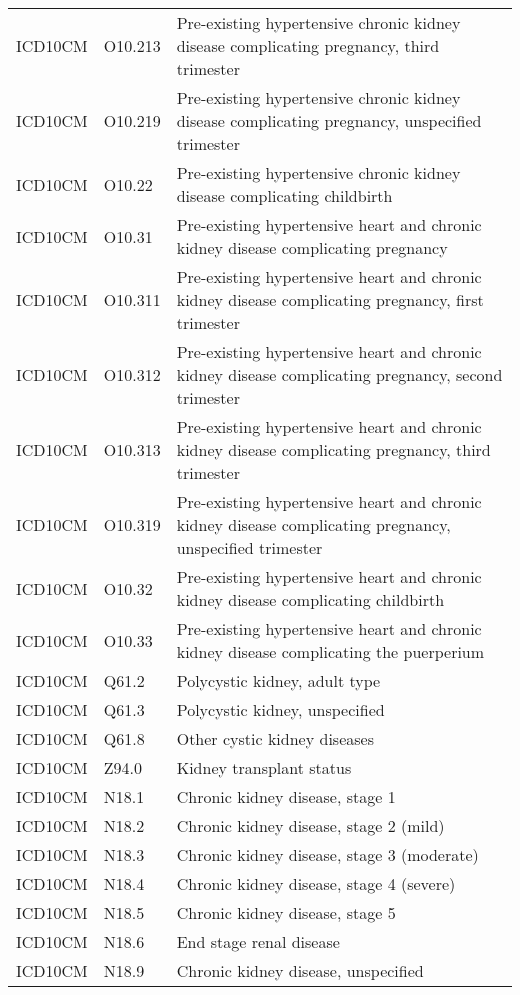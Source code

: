 \begin{table}[ht]
\begin{tabular}{lll}
  ICD10CM & O10.213 & Pre-existing hypertensive chronic kidney disease complicating pregnancy, third trimester \\ 
  ICD10CM & O10.219 & Pre-existing hypertensive chronic kidney disease complicating pregnancy, unspecified trimester \\ 
  ICD10CM & O10.22 & Pre-existing hypertensive chronic kidney disease complicating childbirth \\ 
  ICD10CM & O10.31 & Pre-existing hypertensive heart and chronic kidney disease complicating pregnancy \\ 
  ICD10CM & O10.311 & Pre-existing hypertensive heart and chronic kidney disease complicating pregnancy, first trimester \\ 
  ICD10CM & O10.312 & Pre-existing hypertensive heart and chronic kidney disease complicating pregnancy, second trimester \\ 
  ICD10CM & O10.313 & Pre-existing hypertensive heart and chronic kidney disease complicating pregnancy, third trimester \\ 
  ICD10CM & O10.319 & Pre-existing hypertensive heart and chronic kidney disease complicating pregnancy, unspecified trimester \\ 
  ICD10CM & O10.32 & Pre-existing hypertensive heart and chronic kidney disease complicating childbirth \\ 
  ICD10CM & O10.33 & Pre-existing hypertensive heart and chronic kidney disease complicating the puerperium \\ 
  ICD10CM & Q61.2 & Polycystic kidney, adult type \\ 
  ICD10CM & Q61.3 & Polycystic kidney, unspecified \\ 
  ICD10CM & Q61.8 & Other cystic kidney diseases \\ 
  ICD10CM & Z94.0 & Kidney transplant status \\ 
  ICD10CM & N18.1 & Chronic kidney disease, stage 1 \\ 
  ICD10CM & N18.2 & Chronic kidney disease, stage 2 (mild) \\ 
  ICD10CM & N18.3 & Chronic kidney disease, stage 3 (moderate) \\ 
  ICD10CM & N18.4 & Chronic kidney disease, stage 4 (severe) \\ 
  ICD10CM & N18.5 & Chronic kidney disease, stage 5 \\ 
  ICD10CM & N18.6 & End stage renal disease \\ 
  ICD10CM & N18.9 & Chronic kidney disease, unspecified \\ 

\end{tabular}
\end{table}
